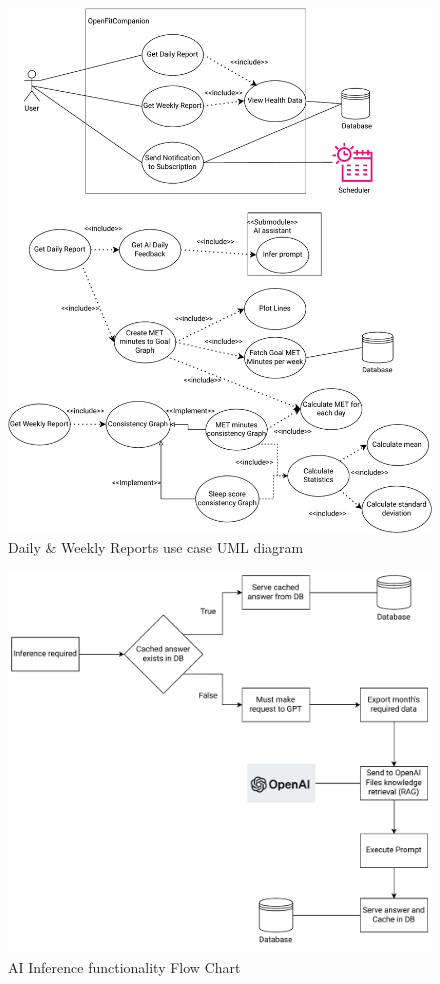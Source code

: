 \begin{figure}
    \centering
    \includegraphics[width=\textwidth,height=\textheight,keepaspectratio]{../images/reports.pdf}
    \caption{Daily \& Weekly Reports use case UML diagram}
    \label{fig:4}
\end{figure}
\begin{figure}
    \centering
    \includegraphics[width=\textwidth,height=\textheight,keepaspectratio]{../images/ai.pdf}
    \caption{AI Inference functionality Flow Chart}
    \label{fig:5}
\end{figure}


